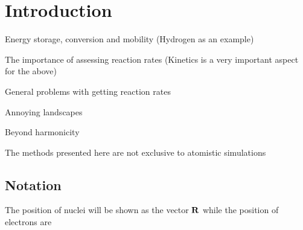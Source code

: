 \chapter{Introduction}
\label{chap:introduction}

\bit
\item Energy storage, conversion and mobility (Hydrogen as an example)
\item The importance of assessing reaction rates (Kinetics is a very important aspect for the above)
\item General problems with getting reaction rates
\item Annoying landscapes
\item Beyond harmonicity
\item The methods presented here are not exclusive to atomistic simulations
\eit

\placeholder

\section{Notation}
The position of nuclei will be shown as the vector ${\mathrm{\mathbf{\bm{R}}}}$ while the position of electrons are \expand


